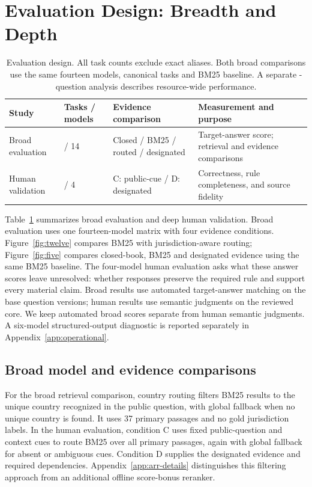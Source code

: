 \documentclass[11pt]{article}
\DeclareRobustCommand{\claim}[2]{#2}
\begin{document}
\section{Evaluation Design: Breadth and Depth}
\begin{table}[t]
\centering\small\setlength{\tabcolsep}{5pt}
\claim{DESIGN}{
\begin{tabular}{p{}p{}p{.24\textwidth}p{.31\textwidth}}
\toprule
Study & Tasks / models & Evidence comparison & Measurement and purpose \\
\midrule
Broad evaluation & \RNARRCore{} / 14 & Closed / BM25 / routed / designated & Target-answer score; retrieval and evidence comparisons \\
Human validation & \RNCore{} / 4 & C: public-cue / D: designated & Correctness, rule completeness, and source fidelity \\
\bottomrule
\end{tabular}
}
\caption{\claim{CAPSTUDY}{Evaluation design. All task counts exclude exact aliases. Both broad comparisons use the same fourteen models, canonical tasks and BM25 baseline. A separate \RNARRUnique{}-question analysis describes resource-wide performance.}}
\label{tab:studies}
\end{table}

\claim{DESIGN}{Table~\ref{tab:studies} summarizes broad evaluation and deep human validation. Broad evaluation uses one fourteen-model matrix with four evidence conditions. Figure~\ref{fig:twelve} compares BM25 with jurisdiction-aware routing; Figure~\ref{fig:five} compares closed-book, BM25 and designated evidence using the same BM25 baseline. The four-model human evaluation asks what these answer scores leave unresolved: whether responses preserve the required rule and support every material claim. Broad results use automated target-answer matching on the base question versions; human results use semantic judgments on the reviewed core. We keep automated broad scores separate from human semantic judgments. A six-model structured-output diagnostic is reported separately in Appendix~\ref{app:operational}.}



\subsection{Broad model and evidence comparisons}
\claim{ROUTING}{For the broad retrieval comparison, country routing filters BM25 results to the unique country recognized in the public question, with global fallback when no unique country is found. It uses 37 primary passages and no gold jurisdiction labels. In the human evaluation, condition C uses fixed public-question and context cues to route BM25 over all \RNPrimary{} primary passages, again with global fallback for absent or ambiguous cues. Condition D supplies the designated evidence and required dependencies. Appendix~\ref{app:arr-details} distinguishes this filtering approach from an additional offline score-bonus reranker.}
\end{document}
